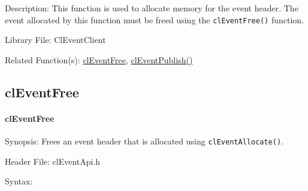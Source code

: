 \begin{flushleft}
\begin{Desc}
\begin{description}
\end{description}
\end{Desc}
\begin{Desc}
\item[Description:]This function is used to allocate memory for the event header. The event allocated by this function must be freed using the 
{\tt{clEventFree()}} function.\end{Desc}
\begin{Desc}
\item[Library File:]Cl\-Event\-Client\end{Desc}
\begin{Desc}
\item[Related Function(s):]\hyperlink{pageem108}{cl\-Event\-Free}, \hyperlink{pageem113}{cl\-Event\-Publish()} \end{Desc}
\newpage


\subsection{clEventFree}
\hypertarget{pageem108}{}\paragraph{cl\-Event\-Free}\label{pageem108}
\begin{Desc}
\item[Synopsis:]Frees an event header that is allocated using {\tt{clEventAllocate()}}.\end{Desc}
\begin{Desc}
\item[Header File:]clEventApi.h\end{Desc}
\begin{Desc}
\item[Syntax:]


\end{Desc}
\end{flushleft}
